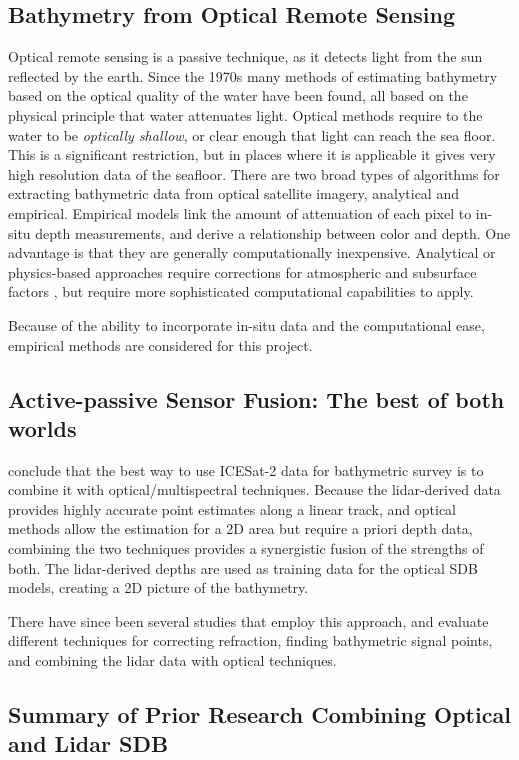 \subsection{Bathymetry from Optical Remote Sensing}
Optical remote sensing is a passive technique, as it detects light from the sun reflected by the earth. Since the 1970s many methods of estimating bathymetry based on the optical quality of the water have been found, all based on the physical principle that water attenuates light. Optical methods require to the water to be \emph{optically shallow}, or clear enough that light can reach the sea floor. This is a significant restriction, but in places where it is applicable it gives very high resolution data of the seafloor. There are two broad types of algorithms for extracting bathymetric data from optical satellite imagery, analytical and empirical. Empirical models link the amount of attenuation of each pixel to in-situ depth measurements, and derive a relationship between color and depth. One advantage is that they are generally computationally inexpensive. Analytical or physics-based approaches require corrections for atmospheric and subsurface factors \parencite{Turner2021}, but require more sophisticated computational capabilities to apply.

Because of the ability to incorporate in-situ data and the computational ease, empirical methods are considered for this project.

\subsection{Active-passive Sensor Fusion: The best of both worlds}
\cite{Parrish2019} conclude that the best way to use ICESat-2 data for bathymetric survey is to combine it with optical/multispectral techniques. Because the lidar-derived data provides highly accurate point estimates along a linear track, and optical methods allow the estimation for a 2D area but require a priori depth data, combining the two techniques provides a synergistic fusion of the strengths of both. The lidar-derived depths are used as training data for the optical SDB models, creating a 2D picture of the bathymetry.

There have since been several studies that employ this approach, and evaluate different techniques for correcting refraction, finding bathymetric signal points, and combining the lidar data with optical techniques.

\subsection{Summary of Prior Research Combining Optical and Lidar SDB}

